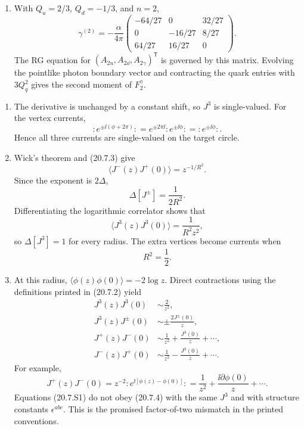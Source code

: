 \begin{enumerate}
\begin{enumerate}
      \(\gamma^{(n)}=-(\alpha/4\pi)a^{(n)}\).
    \item[(c)] With \(Q_u=2/3\), \(Q_d=-1/3\), and \(n=2\),
      \[
        \boxed{\gamma^{(2)}=-\frac{\alpha}{4\pi}
        \begin{pmatrix}
          -64/27&0&32/27\\
          0&-16/27&8/27\\
          64/27&16/27&0
        \end{pmatrix}.}
      \]
      The RG equation for
      \((A_{2u},A_{2\dd},A_{2\gamma})^{\mathsf T}\) is governed by this matrix.
      Evolving the pointlike photon boundary vector and contracting the
      quark entries with \(3Q_q^2\) gives the second moment of
      \(F_2^\gamma\).
  \end{enumerate}

  \begin{enumerate}
    \item[(a)]
    The derivative is unchanged by a constant shift, so \(J^3\) is
    single-valued.  For the vertex currents,
    \[
      :e^{\pm \ii(\phi+2\pi)}:
        =e^{\pm2\pi \ii}:e^{\pm \ii\phi}:
        =:e^{\pm \ii\phi}: .
    \]
    Hence all three currents are single-valued on the target circle.

    \item[(b)]
    Wick's theorem and (20.7.3) give
    \[
      \langle J^-(z)J^+(0)\rangle=z^{-1/R^2}.
    \]
    Since the exponent is \(2\Delta\),
    \[
      \Delta[J^\pm]=\frac{1}{2R^2}.
    \]
    Differentiating the logarithmic correlator shows that
    \[
      \langle J^3(z)J^3(0)\rangle
        =\frac{1}{R^2z^2},
    \]
    so \(\Delta[J^3]=1\) for every radius.  The extra vertices become
    currents when
    \[
      \boxed{R^2=\frac12.}
    \]

    \item[(c)]
    At this radius,
    \(\langle\phi(z)\phi(0)\rangle=-2\log z\).  Direct contractions using
    the definitions printed in (20.7.2) yield
    \[
      \begin{aligned}
        J^3(z)J^3(0)&\sim\frac{2}{z^2},\\
        J^3(z)J^\pm(0)&\sim
          \pm\frac{2J^\pm(0)}{z},\\
        J^+(z)J^-(0)&\sim
          \frac{1}{z^2}+\frac{J^3(0)}{z}+\cdots,\\
        J^-(z)J^+(0)&\sim
          \frac{1}{z^2}-\frac{J^3(0)}{z}+\cdots .
      \end{aligned}
      \tag{20.7.S1}
    \]
    For example,
    \[
      J^+(z)J^-(0)
       =z^{-2}:\!e^{\ii[\phi(z)-\phi(0)]}\!:
       =\frac{1}{z^2}+\frac{\ii\partial\phi(0)}{z}+\cdots .
    \]
    Equations (20.7.S1) do not obey (20.7.4) with the same \(J^3\) and
    with structure constants \(\epsilon^{abc}\).  This is the promised
    factor-of-two mismatch in the printed conventions.


\end{enumerate}
\end{enumerate}
